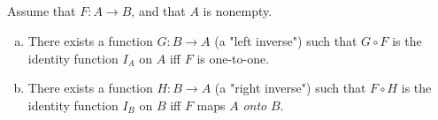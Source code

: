 \documentclass{report}
\begin{document}
\subsection{}%

  \begin{theorem}[3J]
    Assume that $F \colon A \rightarrow B$, and that $A$ is nonempty.
    \begin{enumerate}[(a)]
      \item There exists a function $G \colon B \rightarrow A$
        (a "left inverse") such that $G \circ F$ is the identity function $I_A$
        on $A$ iff $F$ is one-to-one.
      \item There exists a function $H \colon B \rightarrow A$
        (a "right inverse") such that $F \circ H$ is the identity function $I_B$
        on $B$ iff $F$ maps $A$ \textit{onto} $B$.
    \end{enumerate}
  \end{theorem}
\end{document}
